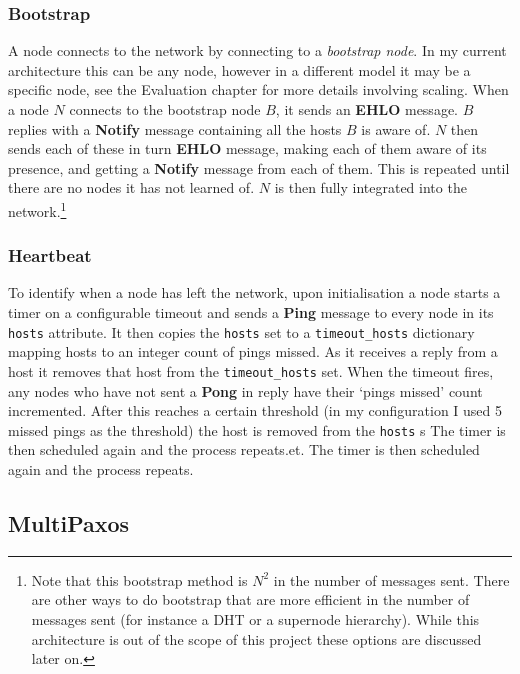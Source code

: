 \documentclass[12pt,twoside,notitlepage]{report}
\newcommand{\msg}[1] {{\bf #1}}         %
\begin{document}

\subsubsection{Bootstrap}

A node connects to the network by connecting to a \emph{bootstrap node}. In my current
architecture this can be any node, however in a different model it may be a specific node, see the
Evaluation chapter for more details involving scaling. When a node $N$ connects to the bootstrap
node $B$, it sends an \msg{EHLO} message. $B$ replies with a \msg{Notify} message containing all the
hosts $B$ is aware of. $N$ then sends each of these in turn \msg{EHLO} message, making each of them
aware of its presence, and getting a \msg{Notify} message from each of them. This is repeated until
there are no nodes it has not learned of. $N$ is then fully integrated into the network.\footnote{
Note that this bootstrap method is $N^2$ in the number of messages sent. There are other ways to
do bootstrap that are more efficient in the number of messages sent (for instance a DHT or a
supernode hierarchy). While this architecture is out of the scope of this project these options are
discussed later on.}

\subsubsection{Heartbeat}

To identify when a node has left the network, upon initialisation a node starts a timer on a
configurable timeout and sends a \msg{Ping} message to every node in its \verb+hosts+ attribute.
It then copies the \verb+hosts+ set to a \verb+timeout_hosts+ dictionary mapping hosts to an
integer count of pings missed. As it receives a reply from a host it removes that host from the
\verb+timeout_hosts+ set. When the timeout fires, any nodes who have not sent a \msg{Pong} in
reply have their `pings missed' count incremented. After this reaches a certain threshold (in my
configuration I used 5 missed pings as the threshold) the host is removed from the \verb+hosts+
s The timer is then scheduled again and the process repeats.et. The timer is then scheduled again and the process repeats.

\subsection{MultiPaxos}
\end{document}
